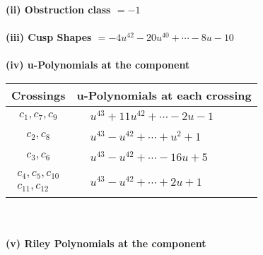 \documentclass[1p]{elsarticle_modified}
\theoremstyle{definition}
\begin{document}
\flushleft \textbf{(ii) Obstruction class $= -1$}\\~\\
\flushleft \textbf{(iii) Cusp Shapes $= -4 u^{42}-20 u^{40}+\cdots-8 u-10$}\\~\\
\newpage\renewcommand{\arraystretch}{1}
\flushleft \textbf{(iv) u-Polynomials at the component}\newline \\
\begin{tabular}{m{50pt}|m{274pt}}
Crossings & \hspace{64pt}u-Polynomials at each crossing \\
\hline $$\begin{aligned}c_{1},c_{7},c_{9}\end{aligned}$$&$\begin{aligned}
&u^{43}+11 u^{42}+\cdots-2 u-1
\end{aligned}$\\
\hline $$\begin{aligned}c_{2},c_{8}\end{aligned}$$&$\begin{aligned}
&u^{43}- u^{42}+\cdots+u^2+1
\end{aligned}$\\
\hline $$\begin{aligned}c_{3},c_{6}\end{aligned}$$&$\begin{aligned}
&u^{43}- u^{42}+\cdots-16 u+5
\end{aligned}$\\
\hline $$\begin{aligned}c_{4},c_{5},c_{10}\\c_{11},c_{12}\end{aligned}$$&$\begin{aligned}
&u^{43}- u^{42}+\cdots+2 u+1
\end{aligned}$\\
\hline
\end{tabular}\\~\\
\newpage\renewcommand{\arraystretch}{1}
\flushleft \textbf{(v) Riley Polynomials at the component}\newline \\
\end{document}
